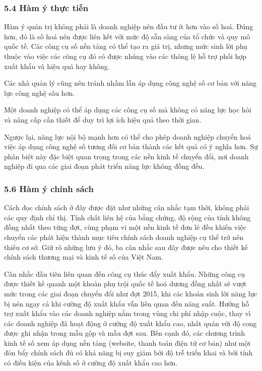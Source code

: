 \documentclass[12pt,a4paper]{article}
\begin{document}
\hypertarget{54-huxe0m-uxfd-thux1ef1c-tiux1ec5n}{%
\subsubsection{5.4 Hàm ý thực
tiễn}\label{54-huxe0m-uxfd-thux1ef1c-tiux1ec5n}}

Hàm ý quản trị không phải là doanh nghiệp nên đầu tư ít hơn vào số hoá.
Đúng hơn, đó là số hoá nên được liên kết với mức độ sẵn sàng của tổ chức
và quy mô quốc tế. Các công cụ số nền tảng có thể tạo ra giá trị, nhưng
mức sinh lời phụ thuộc vào việc các công cụ đó có được nhúng vào các
thông lệ hỗ trợ phối hợp xuất khẩu và hiệu quả hay không.

Các nhà quản lý cũng nên tránh nhầm lẫn áp dụng công nghệ số cơ bản với
năng lực công nghệ sâu hơn.

Một doanh nghiệp có thể áp dụng các công cụ số mà không có năng lực học
hỏi và nâng cấp cần thiết để duy trì lợi ích hiệu quả theo thời gian.

Ngược lại, năng lực nội bộ mạnh hơn có thể cho phép doanh nghiệp chuyển
hoá việc áp dụng công nghệ số tương đối cơ bản thành các kết quả có ý
nghĩa hơn. Sự phân biệt này đặc biệt quan trọng trong các nền kinh tế
chuyển đổi, nơi doanh nghiệp đi qua các giai đoạn phát triển năng lực
không đồng đều.

\hypertarget{56-huxe0m-uxfd-chuxednh-suxe1ch}{%
\subsubsection{5.6 Hàm ý chính
sách}\label{56-huxe0m-uxfd-chuxednh-suxe1ch}}

Cách đọc chính sách ở đây được đặt như những cân nhắc tạm thời, không
phải các quy định chỉ thị. Tính chất liên hệ của bằng chứng, độ rộng của
tính không đồng nhất theo từng đợt, cùng phạm vi một nền kinh tế đơn lẻ
đều khiến việc chuyển các phát hiện thành mục tiêu chính sách doanh
nghiệp cụ thể trở nên thiếu cơ sở. Giữ rõ những lưu ý đó, ba cân nhắc
sau đây được nêu cho thiết kế chính sách thương mại và kinh tế số của
Việt Nam.

Cân nhắc đầu tiên liên quan đến công cụ thúc đẩy xuất khẩu. Những công
cụ được thiết kế quanh một khoản phụ trội quốc tế hoá dương đồng nhất sẽ
vượt mức trong các giai đoạn chuyển đổi như đợt 2015, khi các khoản sinh
lời năng lực bị nén ngay cả khi cường độ xuất khẩu vẫn liên quan đến
năng suất. Hướng hỗ trợ xuất khẩu vào các doanh nghiệp nằm trong vùng
chi phí nhập cuộc, thay vì các doanh nghiệp đã hoạt động ở cường độ xuất
khẩu cao, nhất quán với độ cong được ghi nhận trong mẫu gộp và mẫu đợt
sau. Bên cạnh đó, các chương trình kinh tế số xem áp dụng nền tảng
(website, thanh toán điện tử cơ bản) như một đòn bẩy chính sách đủ có
khả năng bị suy giảm bởi độ trễ triển khai và bởi tính có điều kiện của
kênh số ở cường độ xuất khẩu cao hơn.
\end{document}
